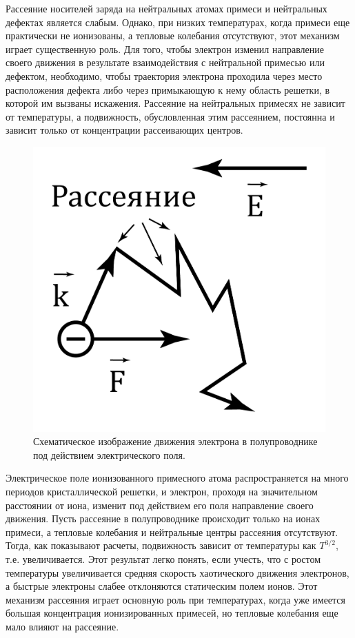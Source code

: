 		Рассеяние носителей заряда на нейтральных атомах примеси и нейтральных дефектах является слабым. Однако, при низких
		температурах, когда примеси еще практически не ионизованы, а тепловые колебания отсутствуют, этот механизм играет
		существенную роль. Для того, чтобы электрон изменил направление своего движения в результате взаимодействия с
		нейтральной примесью или дефектом, необходимо, чтобы траектория электрона проходила через место расположения дефекта
		либо через примыкающую к нему область решетки, в которой им вызваны искажения. Рассеяние на нейтральных примесях не
		зависит от температуры, а подвижность, обусловленная этим рассеянием, постоянна и зависит только от концентрации
		рассеивающих центров.
		\begin{figure}
			\centering
			\includegraphics[width = .9\linewidth]{img/31}
			\caption{Схематическое изображение движения электрона в полупроводнике под действием электрического поля.}
			\label{fig:3.1}
		\end{figure}
		
		Электрическое поле ионизованного примесного атома распространяется на много периодов кристаллической решетки, и
		электрон, проходя на значительном расстоянии от иона, изменит под действием его поля направление своего движения. Пусть
		рассеяние в полупроводнике происходит только на ионах примеси, а тепловые колебания и нейтральные центры рассеяния
		отсутствуют. Тогда, как показывают расчеты, подвижность зависит от температуры как $T^{3/2}$, т.е. увеличивается. Этот
		результат легко понять, если учесть, что с ростом температуры увеличивается средняя скорость хаотического движения
		электронов, а быстрые электроны слабее отклоняются статическим полем ионов. Этот механизм рассеяния играет основную роль
		при температурах, когда уже имеется большая концентрация ионизированных примесей, но тепловые колебания еще мало влияют
		на рассеяние. 
		
